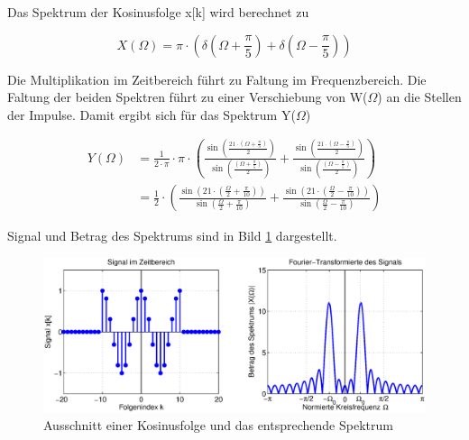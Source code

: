 \noindent Das Spektrum der Kosinusfolge x[k] wird berechnet zu

\begin{equation}\label{eq:sevenseightyfour}
X\left(\Omega \right)=\pi \cdot \left(\delta \left(\Omega +\frac{\pi }{5} \right)+\delta \left(\Omega -\frac{\pi }{5} \right)\right)
\end{equation}

\noindent Die Multiplikation im Zeitbereich f\"{u}hrt zu Faltung im Frequenzbereich. Die Faltung der beiden Spektren f\"{u}hrt zu einer Verschiebung von W($\Omega$) an die Stellen der Impulse. Damit ergibt sich f\"{u}r das Spektrum Y($\Omega$)

\begin{equation}\label{eq:sevenseightyfive}
\begin{split}
Y\left(\Omega \right) &=\frac{1}{2\cdot \pi } \cdot \pi \cdot \left(\frac{\sin \left(\frac{21\cdot \left(\Omega +\frac{\pi }{5} \right)}{2} \right)}{\sin \left(\frac{\left(\Omega +\frac{\pi }{5} \right)}{2} \right)} +\frac{\sin \left(\frac{21\cdot \left(\Omega -\frac{\pi }{5} \right)}{2} \right)}{\sin \left(\frac{\left(\Omega -\frac{\pi }{5} \right)}{2} \right)} \right) \\ 
& =\frac{1}{2} \cdot \left(\frac{\sin \left(21\cdot \left(\frac{\Omega }{2} +\frac{\pi }{10} \right)\right)}{\sin \left(\frac{\Omega }{2} +\frac{\pi }{10} \right)} +\frac{\sin \left(21\cdot \left(\frac{\Omega }{2} -\frac{\pi }{10} \right)\right)}{\sin \left(\frac{\Omega }{2} -\frac{\pi }{10} \right)} \right)
\end{split}
\end{equation}

\noindent Signal und Betrag des Spektrums sind in Bild \ref{fig:FourierFensterung} dargestellt.

\begin{figure}[H]
  \centerline{\includegraphics[width=1\textwidth]{Kapitel7/Bilder/image11.eps}}
  \caption{Ausschnitt einer Kosinusfolge und das entsprechende Spektrum}
  \label{fig:FourierFensterung}
\end{figure}

